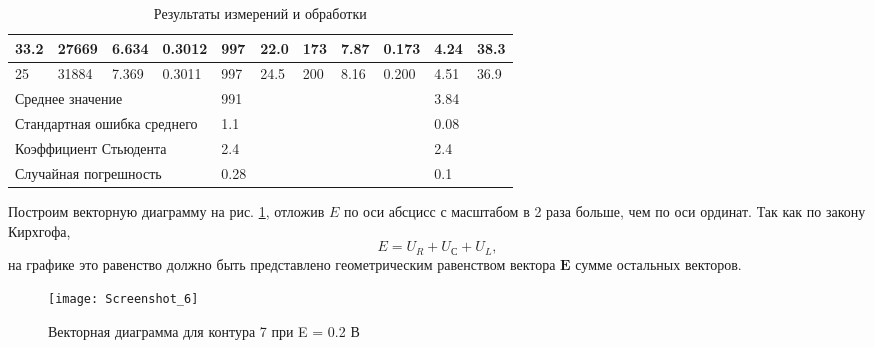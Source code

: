 \documentclass[a4paper]{article}
\begin{document}
\begin{table}[tb]
\begin{tabular}{|l|l|l|l|l|l|l|l|l|l|l|}
		33.2       & 27669          & 6.634     & 0.3012  & 997       & 22.0 & 173        & 7.87           & 0.173           & 4.24      & 38.3    \\ \hline
		25         & 31884          & 7.369     & 0.3011  & 997       & 24.5 & 200        & 8.16           & 0.200           & 4.51      & 36.9    \\ \hline
		\multicolumn{4}{|l|}{Среднее значение}            & 991       &      &            &                &                 & 3.84      &         \\ \hline
		\multicolumn{4}{|l|}{Стандартная ошибка среднего} & 1.1       &      &            &                &                 & 0.08      &         \\ \hline
		\multicolumn{4}{|l|}{Коэффициент Стьюдента}       & 2.4       &      &            &                &                 & 2.4       &         \\ \hline
		\multicolumn{4}{|l|}{Случайная погрешность}       & 0.28      &      &            &                &                 & 0.1       &         \\ \hline
	\end{tabular}
	\caption{Результаты измерений и обработки}
	\label{tab:res}
\end{table}

Построим векторную диаграмму на рис. \ref{diag}, отложив $ E $ по оси абсцисс с масштабом в 2 раза больше, чем по оси ординат.
Так как по закону Кирхгофа, \begin{equation}\label{kir}
	E = U_R + U_С + U_L,
\end{equation} 
на графике это равенство должно быть представлено геометрическим равенством вектора $ \mathbf{E} $ сумме остальных векторов.
\begin{figure}
	\centering
	\texttt{[image: Screenshot\_6]}
	\caption{Векторная диаграмма для контура 7 при E = 0.2 В}
	\label{diag}
\end{figure}
\end{document}
